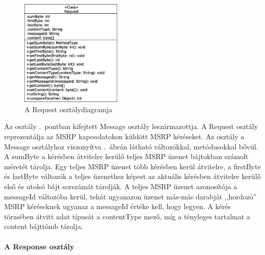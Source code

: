 \begin{figure}
  \vspace{-15pt}
  \begin{center}
    \includegraphics[width=0.43\textwidth]{img/class_diagrams/Request.eps}
  \end{center}
  \vspace{-15pt}
  \captionsetup{font=scriptsize}
  \caption{A Request osztálydiagramja}
   \label{fig:class_request}
  \vspace{-10pt}
\end{figure}
Az osztály .~pontban kifejtett Message osztály leszármazottja. A Request osztály reprezentálja az MSRP kapcsolatokon küldött MSRP kéréseket. Az osztály a Message osztályhoz viszonyítva .~ábrán látható változókkal, metódusokkal bővül. A sumByte a kérésben átvitelre kerülő teljes MSRP üzenet bájtokban számolt méretét tárolja. Egy teljes MSRP üzenet több kérésben kerül átvitelre, a firstByte és lastByte változók a teljes üzenethez képest az aktuális kérésben átvitelre kerülő első és utolsó bájt sorszámát tárolják. A teljes MSRP üzenet azonosítója a messageId változóba kerül, tehát ugyanazon üzenet más-más darabját ,,hordozó'' MSRP kéréseknek ugyanaz a messageId értéke kell, hogy legyen. A kérés törzsében átvitt adat típusát a contentType mező, míg a tényleges tartalmat a content bájttömb tárolja. 

\paragraph{A Response osztály\\}
\label{sec:msrp_response}

